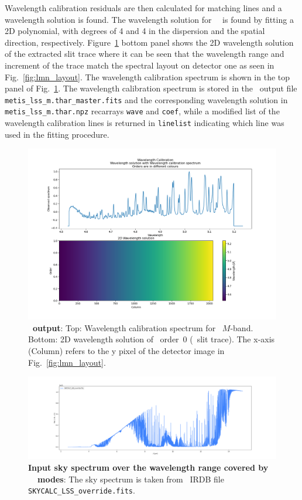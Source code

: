 Wavelength calibration residuals are then calculated for matching lines and a wavelength solution  is found. The wavelength solution for \met~\lss~is found by fitting a 2D polynomial, with degrees of 4 and 4 in the dispersion and the spatial direction, respectively. Figure~\ref{fig:fig12} bottom panel shows the 2D wavelength solution of the extracted slit trace where it can be seen that the wavelength range and increment of the trace match the spectral layout on detector one as seen in Fig.~\ref{fig:lmn_layout}.  The wavelength calibration spectrum is shown in the top panel of Fig.~\ref{fig:fig12}. The wavelength calibration spectrum is stored in the \pyred~output file \texttt{metis\_lss\_m.thar\_master.fits} and the corresponding wavelength solution in \texttt{metis\_lss\_m.thar.npz} recarrays \texttt{wave} and \texttt{coef}, while a modified list of the wavelength calibration lines is returned  in \texttt{linelist} indicating which line was used in the fitting procedure. 

\begin{figure}[!ht]
  \centering
  \includegraphics[width=\textwidth]{figures/LSS_CrtAlg_files/Figure_15.png}
  \caption[PyReduce wavelength solution]{\textbf{\pyred~output}: Top: Wavelength calibration spectrum for  \lss~$M$-band. Bottom: 2D wavelength solution of \pyred~order~0 (\lss~slit trace). The x-axis (Column) refers to the y pixel of the detector image in Fig.~\ref{fig:lmn_layout}. }
  \label{fig:fig12}
\end{figure}

\begin{figure}[!ht]
  \centering
  \includegraphics[width=\textwidth]{figures/LSS_CrtAlg_files/SKYCALC_LSS_override.fits.png}
  \caption[LSS input sky spectrum]{\textbf{Input sky spectrum over the wavelength range covered by \met~\lss~modes}: The sky spectrum is taken from \met~IRDB file \texttt{SKYCALC\_LSS\_override.fits}. }
  \label{fig:sky_spec}
\end{figure}

